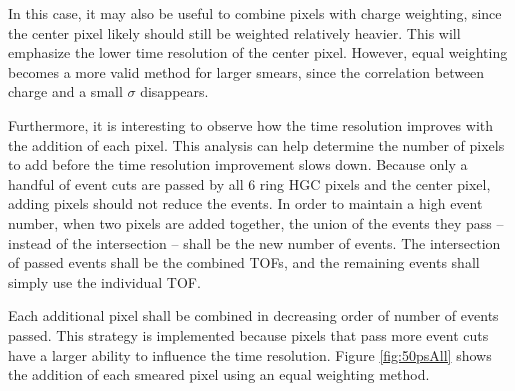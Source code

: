 \documentclass[twocolumn,aps,prd,reprint,superscriptaddress,floatfix]{revtex4-1}
\begin{document}
In this case, it may also be useful to combine pixels with charge weighting, since the center pixel likely should still be weighted relatively heavier.
This will emphasize the lower time resolution of the center pixel.
However, equal weighting becomes a more valid method for larger smears, since the correlation between charge and a small $\sigma$ disappears.

Furthermore, it is interesting to observe how the time resolution improves with the addition of each pixel. 
This analysis can help determine the number of pixels to add before the time resolution improvement slows down.
Because only a handful of event cuts are passed by all 6 ring HGC pixels and the center pixel, adding pixels should not reduce the events.
In order to maintain a high event number, when two pixels are added together, the union of the events they pass -- instead of the intersection -- shall be the new number of events.
The intersection of passed events shall be the combined TOFs, and the remaining events shall simply use the individual TOF.

Each additional pixel shall be combined in decreasing order of number of events passed.
This strategy is implemented because pixels that pass more event cuts have a larger ability to influence the time resolution.
Figure \ref{fig:50psAll} shows the addition of each smeared pixel using an equal weighting method. 
\end{document}
